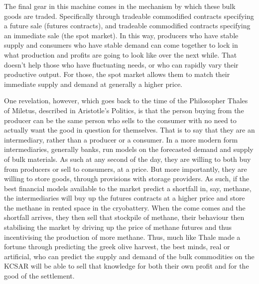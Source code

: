 \documentclass[fleqn,10pt]{Stylesheet} %
\begin{document}
The final gear in this machine comes in the mechanism by which these bulk goods are traded. Specifically through tradeable commodified contracts specifying a future sale (futures contracts), and tradeable commodified contracts specifying an immediate sale (the spot market).
In this way, producers who have stable supply and consumers who have stable demand can come together to lock in what production and profits are going to look like over the next while. That doesn't help those who have fluctuating needs, or who can rapidly vary their productive output. For those, the spot market allows them to match their immediate supply and demand at generally a higher price.

One revelation, however, which goes back to the time of the Philosopher Thales of Miletus, described in Aristotle's Politics\cite{Aristotle4}, is that the person buying from the producer can be the same person who sells to the consumer with no need to actually want the good in question for themselves. That is to say that they are an intermediary, rather than a producer or a consumer. In a more modern form intermediaries, generally banks, run models on the forecasted demand and supply of bulk materials. As such at any second of the day, they are willing to both buy from producers or sell to consumers, at a price. But more importantly, they are willing to store goods, through provisions with storage providers. As such, if the best financial models available to the market predict a shortfall in, say, methane, the intermediaries will buy up the futures contracts at a higher price and store the methane in rented space in the cryobattery. When the come comes and the shortfall arrives, they then sell that stockpile of methane, their behaviour then stabilising the market by driving up the price of methane futures and thus incentivising the production of more methane. Thus, much like Thale made a fortune through predicting the greek olive harvest, the best minds, real or artificial, who can predict the supply and demand of the bulk commodities on the KCSAR will be able to sell that knowledge for both their own profit and for the good of the settlement.
\end{document}

